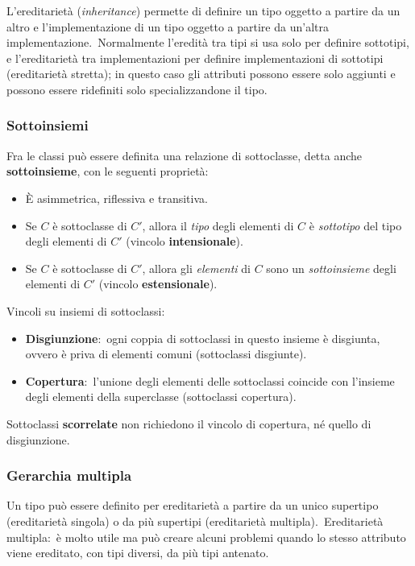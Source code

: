 L'ereditarietà (\textit{inheritance}) permette di definire un tipo oggetto a partire da un altro e l'implementazione di un tipo oggetto a partire da un'altra implementazione.\
Normalmente l'eredità tra tipi si usa solo per definire sottotipi, e l'ereditarietà tra implementazioni per definire implementazioni di
sottotipi (ereditarietà stretta); in questo caso gli attributi possono essere solo aggiunti e possono essere ridefiniti solo specializzandone il tipo.

\subsubsection{Sottoinsiemi}

Fra le classi può essere definita una relazione di sottoclasse, detta anche \textbf{sottoinsieme}, con le seguenti proprietà:
\begin{itemize}
	\item È asimmetrica, riflessiva e transitiva.
	\item Se $C$ è sottoclasse di $C'$, allora il \textit{tipo} degli elementi di $C$ è \textit{sottotipo} del tipo degli elementi di $C'$ (vincolo \textbf{intensionale}).
	\item Se $C$ è sottoclasse di $C'$, allora gli \textit{elementi} di $C$ sono un \textit{sottoinsieme} degli elementi di $C'$ (vincolo \textbf{estensionale}).
\end{itemize}
Vincoli su insiemi di sottoclassi:
\begin{itemize}
	\item \textbf{Disgiunzione}:\ ogni coppia di sottoclassi in questo insieme è disgiunta, ovvero è priva di elementi comuni (sottoclassi disgiunte).
	\item \textbf{Copertura}:\ l'unione degli elementi delle sottoclassi coincide con l'insieme degli elementi della superclasse (sottoclassi copertura).
\end{itemize}
Sottoclassi \textbf{scorrelate} non richiedono il vincolo di copertura, né quello di disgiunzione.

\subsubsection{Gerarchia multipla}

Un tipo può essere definito per ereditarietà a partire da un unico supertipo (ereditarietà singola) o da più supertipi (ereditarietà multipla).\
Ereditarietà multipla:\ è molto utile ma può creare alcuni problemi quando lo stesso attributo viene ereditato, con tipi diversi, da più tipi antenato.

